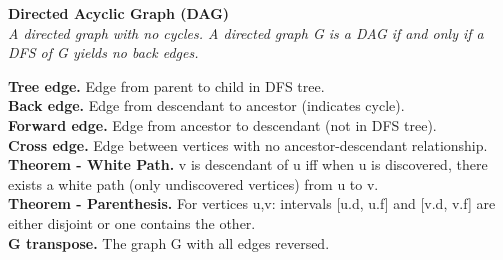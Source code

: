 {\begin{minipage}[t]{1.1\linewidth}
\begin{minipage}[t]{0.45\linewidth}
{\begin{minipage}[t]{0.98\linewidth}
        \end{minipage}}
    \textbf{Directed Acyclic Graph (DAG)}\\
    \textit{A directed graph with no cycles. A directed graph G is a DAG if and only if a DFS of G yields no back edges.}\\
\end{minipage}
        \begin{minipage}[t]{0.46\linewidth}\vspace*{-15px}
            \textbf{Tree edge.} Edge from parent to child in DFS tree.\\
\textbf{Back edge.} Edge from descendant to ancestor (indicates cycle).\\
\textbf{Forward edge.} Edge from ancestor to descendant (not in DFS tree).\\
\textbf{Cross edge.} Edge between vertices with no ancestor-descendant relationship.\\[2px]
\textbf{Theorem - White Path.} v is descendant of u iff when u is discovered, there exists a white path (only undiscovered vertices) from u to v.\\
\textbf{Theorem - Parenthesis.} For vertices u,v: intervals [u.d, u.f] and [v.d, v.f] are either disjoint or one contains the other.\\
\textbf{G transpose.} The graph G with all edges reversed.\\
\end{minipage}
\end{minipage}}
